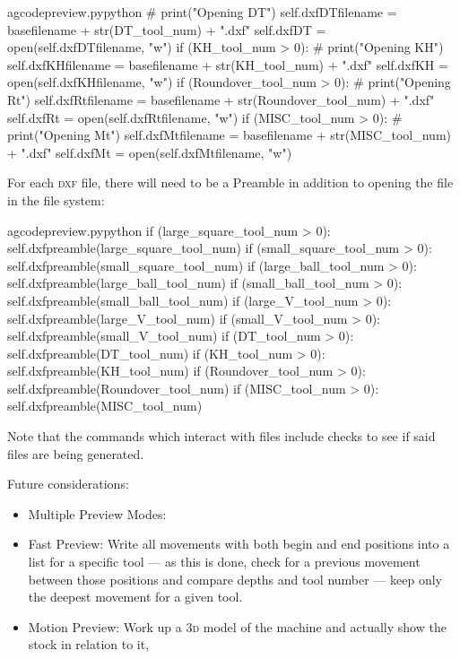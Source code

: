 \documentclass{ltxdoc}
\begin{document}
\begin{writecode}{a}{gcodepreview.py}{python}
#                print("Opening DT")
                self.dxfDTfilename = basefilename + str(DT_tool_num) + ".dxf"
                self.dxfDT = open(self.dxfDTfilename, "w")
            if (KH_tool_num > 0):
#                print("Opening KH")
                self.dxfKHfilename = basefilename + str(KH_tool_num) + ".dxf"
                self.dxfKH = open(self.dxfKHfilename, "w")
            if (Roundover_tool_num > 0):
#                print("Opening Rt")
                self.dxfRtfilename = basefilename + str(Roundover_tool_num) + ".dxf"
                self.dxfRt = open(self.dxfRtfilename, "w")
            if (MISC_tool_num > 0):
#                print("Opening Mt")
                self.dxfMtfilename = basefilename + str(MISC_tool_num) + ".dxf"
                self.dxfMt = open(self.dxfMtfilename, "w")
\end{writecode}
\addtocounter{gcpy}{94}

For each \textsc{dxf} file, there will need to be a Preamble in addition to opening the file in the file system:

\lstset{firstnumber=\thegcpy}
\begin{writecode}{a}{gcodepreview.py}{python}
            if (large_square_tool_num > 0):
                self.dxfpreamble(large_square_tool_num)
            if (small_square_tool_num > 0):
                self.dxfpreamble(small_square_tool_num)
            if (large_ball_tool_num > 0):
                self.dxfpreamble(large_ball_tool_num)
            if (small_ball_tool_num > 0):
                self.dxfpreamble(small_ball_tool_num)
            if (large_V_tool_num > 0):
                self.dxfpreamble(large_V_tool_num)
            if (small_V_tool_num > 0):
                self.dxfpreamble(small_V_tool_num)
            if (DT_tool_num > 0):
                self.dxfpreamble(DT_tool_num)
            if (KH_tool_num > 0):
                self.dxfpreamble(KH_tool_num)
            if (Roundover_tool_num > 0):
                self.dxfpreamble(Roundover_tool_num)
            if (MISC_tool_num > 0):
                self.dxfpreamble(MISC_tool_num)

\end{writecode}
\addtocounter{gcpy}{21}

Note that the commands which interact with files include checks to see if said files are being generated.


Future considerations:

\begin{itemize}
\item Multiple Preview Modes:
\item Fast Preview: Write all movements with both begin and end positions into a list for a specific tool --- as this is done, check for a previous movement between those positions and compare depths and tool number --- keep only the deepest movement for a given tool.
\item Motion Preview: Work up a \textsc{3d} model of the machine and actually show the stock in relation to it, 
\end{itemize}
\end{document}
